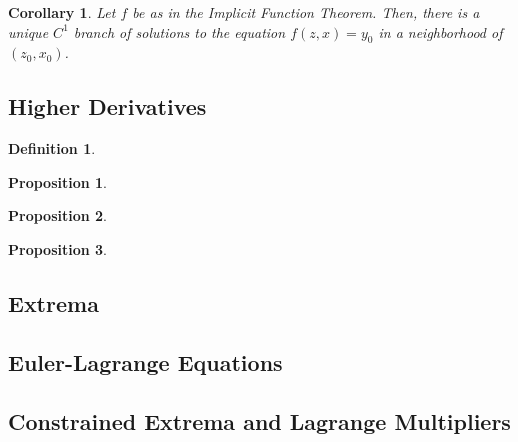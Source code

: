 \documentclass[letterpaper,twoside,12pt]{article}
\theoremstyle{mystyle}
\newtheorem{definition}{Definition}[section]
\newtheorem{corollary}{Corollary}[theorem]
\newtheorem{prop}{Proposition}[section]
\begin{document}
  \begin{corollary}
    Let $f$ be as in the Implicit Function Theorem. Then, there is a unique $C^1$ branch of solutions to the equation $f(z, x) = y_0$ in a neighborhood of $(z_0, x_0)$. 
  \end{corollary}




\subsection{Higher Derivatives}

\begin{definition}
  
\end{definition}

\begin{prop}
  
\end{prop}

\begin{prop}
  
\end{prop}


\begin{prop}
  
\end{prop}





\subsection{Extrema}





\subsection{Euler-Lagrange Equations}





\subsection{Constrained Extrema and Lagrange Multipliers}
\end{document}
